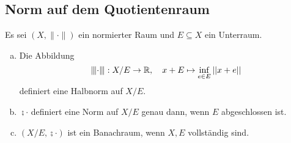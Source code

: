 \documentclass[FunkAnaSkript.tex]{subfiles}
\begin{document}
\subsection{Norm auf dem Quotientenraum}
\label{B4.1}
Es sei $(X, \|\cdot \|)$ ein normierter Raum und $E\subseteq X$ ein Unterraum.
\begin{beh}
	\begin{enumerate}[(a)]
	\item 	Die Abbildung
	$$ \interleave{\cdot}\interleave : X/E \to \mathbb{R},\quad x+E \mapsto \inf_{e\in E} \left\lvert \left\lvert x+e \right\rvert \right\rvert$$
	definiert eine Halbnorm auf $X/E$.
	
	\item 	$\semi{\cdot}$ definiert eine Norm auf $X/E$ genau dann, wenn $E$ abgeschlossen ist. 	
	
	\item $(X/E, \semi{\cdot})$ ist ein Banachraum, wenn $X, E$ vollständig sind.
	
	\end{enumerate}
\end{beh}
\end{document}
